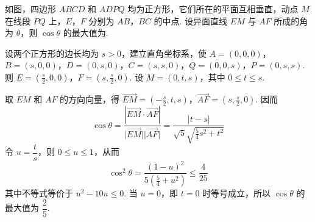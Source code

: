 \begin{problem}
如图，四边形 \(ABCD\) 和 \(ADPQ\) 均为正方形，它们所在的平面互相垂直，动点 \(M\) 在线段 \(PQ\) 上，\(E\)，\(F\) 分别为 \(AB\)，\(BC\) 的中点. 设异面直线 \(EM\) 与 \(AF\) 所成的角为 \(\theta\)，则 \(\cos \theta\) 的最大值为\fillinblank{}.



\begin{solution}
设两个正方形的边长均为 \(s>0\)，建立直角坐标系，使
\(A=(0,0,0)\)，\(B=(s,0,0)\)，\(D=(0,s,0)\)，\(C=(s,s,0)\)，\(Q=(0,0,s)\)，\(P=(0,s,s)\). 则
\(E=\left(\frac s2,0,0\right)\)，\(F=\left(s,\frac s2,0\right)\). 设 \(M=(0,t,s)\)，其中 \(0\leqslant t\leqslant s\).

取 \(EM\) 和 \(AF\) 的方向向量，得
\(\overrightarrow{EM}=\left(-\frac s2,t,s\right)\)，\(\overrightarrow{AF}=\left(s,\frac s2,0\right)\). 因而
\[
\cos\theta=\frac{\left\lvert\overrightarrow{EM}\cdot\overrightarrow{AF}\right\rvert}{\lvert\overrightarrow{EM}\rvert\lvert\overrightarrow{AF}\rvert}
=\frac{\left\lvert t-s\right\rvert}{\sqrt5\sqrt{\frac54s^2+t^2}}
\]
令 \(u=\dfrac ts\)，则 \(0\leqslant u\leqslant1\)，从而
\[
\cos^2\theta=\frac{(1-u)^2}{5\left(\frac54+u^2\right)}\leqslant\frac4{25}
\]
其中不等式等价于 \(u^2-10u\leqslant0\). 当 \(u=0\)，即 \(t=0\) 时等号成立，所以 \(\cos\theta\) 的最大值为
\(\dfrac25\).
\end{solution}
\end{problem}

